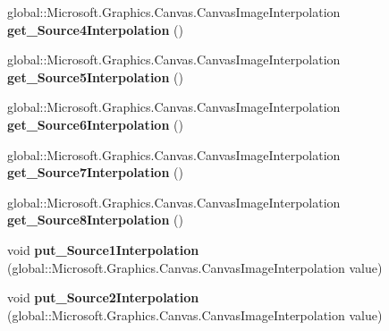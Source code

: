 \begin{DoxyCompactItemize}
global\+::\+Microsoft.\+Graphics.\+Canvas.\+Canvas\+Image\+Interpolation {\bfseries get\+\_\+\+Source4\+Interpolation} ()
\item 
\mbox{\label{interface_microsoft_1_1_graphics_1_1_canvas_1_1_effects_1_1_i_pixel_shader_effect_ab25181eb51282e4637087b9ced7d95c2}} 
global\+::\+Microsoft.\+Graphics.\+Canvas.\+Canvas\+Image\+Interpolation {\bfseries get\+\_\+\+Source5\+Interpolation} ()
\item 
\mbox{\label{interface_microsoft_1_1_graphics_1_1_canvas_1_1_effects_1_1_i_pixel_shader_effect_a041691c5a20058c877d29f7d1f3eda73}} 
global\+::\+Microsoft.\+Graphics.\+Canvas.\+Canvas\+Image\+Interpolation {\bfseries get\+\_\+\+Source6\+Interpolation} ()
\item 
\mbox{\label{interface_microsoft_1_1_graphics_1_1_canvas_1_1_effects_1_1_i_pixel_shader_effect_a239888bd1c60aa6fe3043d838cd213e2}} 
global\+::\+Microsoft.\+Graphics.\+Canvas.\+Canvas\+Image\+Interpolation {\bfseries get\+\_\+\+Source7\+Interpolation} ()
\item 
\mbox{\label{interface_microsoft_1_1_graphics_1_1_canvas_1_1_effects_1_1_i_pixel_shader_effect_a66d81c1ae7aa81564e6e697edd2b8a5d}} 
global\+::\+Microsoft.\+Graphics.\+Canvas.\+Canvas\+Image\+Interpolation {\bfseries get\+\_\+\+Source8\+Interpolation} ()
\item 
\mbox{\label{interface_microsoft_1_1_graphics_1_1_canvas_1_1_effects_1_1_i_pixel_shader_effect_a406969651113c1c6d375abaa399470fe}} 
void {\bfseries put\+\_\+\+Source1\+Interpolation} (global\+::\+Microsoft.\+Graphics.\+Canvas.\+Canvas\+Image\+Interpolation value)
\item 
\mbox{\label{interface_microsoft_1_1_graphics_1_1_canvas_1_1_effects_1_1_i_pixel_shader_effect_a8528f90de93efccbbf11550971390063}} 
void {\bfseries put\+\_\+\+Source2\+Interpolation} (global\+::\+Microsoft.\+Graphics.\+Canvas.\+Canvas\+Image\+Interpolation value)

\end{DoxyCompactItemize}
